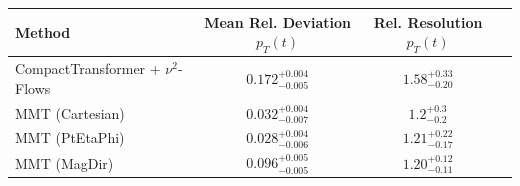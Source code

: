     \begin{tabular}{lccc}
        \toprule
        Method & Mean Rel. Deviation $p_{T}(t)$ & Rel. Resolution $p_{T}(t)$ \\
        \midrule
        CompactTransformer + $\nu^2$-Flows & $0.172^{+0.004}_{-0.005}$ & $1.58^{+0.33}_{-0.20}$ \\
        MMT (Cartesian) & $0.032^{+0.004}_{-0.007}$ & $1.2^{+0.3}_{-0.2}$ \\
        MMT (PtEtaPhi) & $0.028^{+0.004}_{-0.006}$ & $1.21^{+0.22}_{-0.17}$ \\
        MMT (MagDir) & $0.096^{+0.005}_{-0.005}$ & $1.20^{+0.12}_{-0.11}$ \\
        \bottomrule
    \end{tabular}